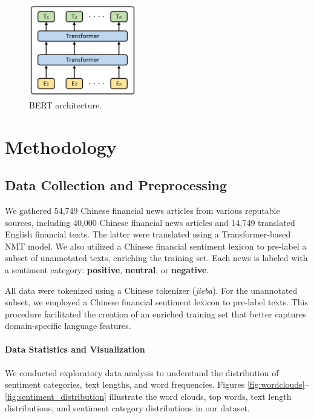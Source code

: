 \documentclass[12pt]{article}
\begin{document}
\begin{figure}[H]
	\centering
	\includegraphics[height=4cm]{BERT.png}
	\caption{BERT architecture.}
\end{figure}

\section{Methodology}
\label{sec:methodology}

\subsection{Data Collection and Preprocessing}
We gathered 54,749 Chinese financial news articles from various reputable sources, including 40,000 Chinese financial news articles and 14,749 translated English financial texts. The latter were translated using a Transformer-based NMT model. We also utilized a Chinese financial sentiment lexicon to pre-label a subset of unannotated texts, enriching the training set. Each news is labeled with a sentiment category: \textbf{positive}, \textbf{neutral}, or \textbf{negative}. 

All data were tokenized using a Chinese tokenizer (\textit{jieba}). For the unannotated subset, we employed a Chinese financial sentiment lexicon to pre-label texts. This procedure facilitated the creation of an enriched training set that better captures domain-specific language features.

\paragraph{Data Statistics and Visualization}
We conducted exploratory data analysis to understand the distribution of sentiment categories, text lengths, and word frequencies. Figures \ref{fig:wordclouds}--\ref{fig:sentiment_distribution} illustrate the word clouds, top words, text length distributions, and sentiment category distributions in our dataset.
\end{document}
